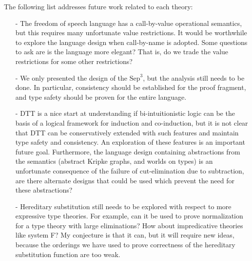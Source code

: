 \documentclass[phd,dedicationpage,ackpage,epigraphpage,figures]{uithesis}
\newcommand{\Sep}[0]{\text{Sep}^3}
\begin{document}
The following list addresses future work related to each theory:
\begin{itemize}
\item[-] The freedom of speech language has a call-by-value
  operational semantics, but this requires many unfortunate value
  restrictions.  It would be worthwhile to explore the language design
  when call-by-name is adopted.  Some questions to ask are is the
  language more elegant?  That is, do we trade the value restrictions
  for some other restrictions?

\item[-] We only presented the design of the $\Sep$, but the analysis
  still needs to be done.  In particular, consistency should be
  established for the proof fragment, and type safety should be proven
  for the entire language.

\item[-] DTT is a nice start at understanding if bi-intuitionistic
  logic can be the basis of a logical framework for induction and
  co-induction, but it is not clear that DTT can be conservatively
  extended with such features and maintain type safety and
  consistency.  An exploration of these features is an important
  future goal.  Furthermore, the language design containing
  abstractions from the semantics (abstract Kripke graphs, and worlds
  on types) is an unfortunate consequence of the failure of
  cut-elimination due to subtraction, are there alternate designs that
  could be used which prevent the need for these abstractions?

\item[-] Hereditary substitution still needs to be explored with
  respect to more expressive type theories.  For example, can it be
  used to prove normalization for a type theory with large
  eliminations?  How about impredicative theories like system F?  My
  conjecture is that it can, but it will require new ideas, because
  the orderings we have used to prove correctness of the hereditary
  substitution function are too weak.
\end{itemize}



\end{document}
